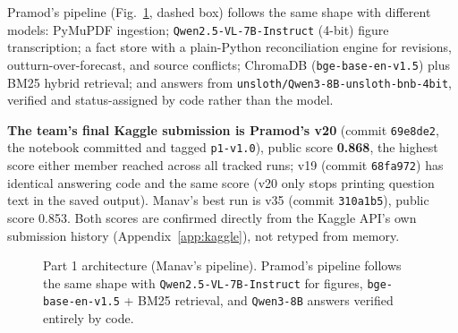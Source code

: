 \documentclass[conference,10pt]{IEEEtran}
\begin{document}
Pramod's pipeline (Fig.~\ref{fig:p1-arch}, dashed box) follows the same shape with different models:
PyMuPDF ingestion; \texttt{Qwen2.5-VL-7B-Instruct} (4-bit) figure transcription; a fact store with a
plain-Python reconciliation engine for revisions, outturn-over-forecast, and source conflicts;
ChromaDB (\texttt{bge-base-en-v1.5}) plus BM25 hybrid retrieval; and answers from
\texttt{unsloth/Qwen3-8B-unsloth-bnb-4bit}, verified and status-assigned by code rather than the
model.

\textbf{The team's final Kaggle submission is Pramod's v20} (commit \texttt{69e8de2}, the notebook committed
and tagged \texttt{p1-v1.0}), public score \textbf{0.868}, the highest score either member reached across all
tracked runs; v19 (commit \texttt{68fa972}) has identical answering code and the same score (v20 only stops
printing question text in the saved output). Manav's best run is
v35 (commit \texttt{310a1b5}), public score 0.853. Both scores are confirmed directly from the
Kaggle API's own submission history (Appendix~\ref{app:kaggle}), not retyped from memory.

\begin{figure}[t]
\centering
{}
\caption{Part 1 architecture (Manav's pipeline). Pramod's pipeline follows the same shape with
\texttt{Qwen2.5-VL-7B-Instruct} for figures, \texttt{bge-base-en-v1.5} + BM25 retrieval, and
\texttt{Qwen3-8B} answers verified entirely by code.}
\label{fig:p1-arch}
\end{figure}
\end{document}
